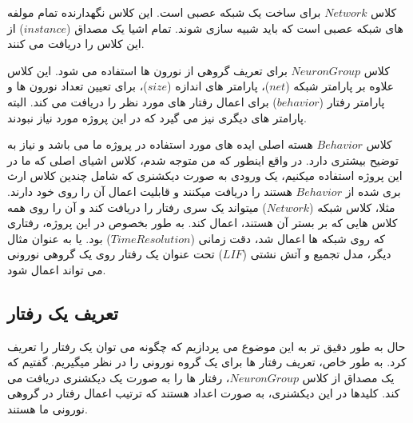 \documentclass{article}
\begin{document}
        کلاس 
        \textbf{$Network$} 
        برای ساخت یک شبکه عصبی است. این کلاس نگهدارنده تمام مولفه های شبکه عصبی است که باید شبیه سازی شوند. تمام اشیا یک مصداق 
        ($instance$) 
        از این کلاس را دریافت می کنند.\cite{PymoNNtorch}

        کلاس 
        \textbf{$NeuronGroup$}
        برای تعریف گروهی از نورون ها استفاده می شود. این کلاس علاوه بر پارامتر شبکه 
        ($net$)،
        پارامتر های اندازه
        ($size$)، 
        برای تعیین تعداد نورون ها و پارامتر رفتار
        ($behavior$) 
        برای اعمال رفتار های مورد نظر را دریافت می کند. البته پارامتر های دیگری نیز می گیرد که در این پروژه مورد نیاز نبودند.

        کلاس 
        \textbf{$Behavior$}
        هسته اصلی ایده های مورد استفاده در پروژه ما می باشد و نیاز به توضیح بیشتری دارد. در واقع اینطور که من متوجه شدم، کلاس اشیای اصلی که ما در این پروژه استفاده میکنیم، یک ورودی به صورت دیکشنری که شامل چندین کلاس ارث بری شده از 
        $Behavior$ 
        هستند را دریافت میکنند و قابلیت اعمال آن را روی خود دارند.
        مثلا، کلاس شبکه
        ($Network$) 
        میتواند یک سری رفتار را دریافت کند و آن را روی همه کلاس هایی که بر بستر آن هستند، اعمال کند. به طور بخصوص در این پروژه، رفتاری که روی شبکه ها اعمال شد، دقت زمانی
        ($TimeResolution$) 
        بود. یا به عنوان مثال دیگر، مدل تجمیع و آتش نشتی
        ($LIF$) 
        تحت عنوان یک رفتار روی یک گروهی نورونی می تواند اعمال شود.

        \subsection{تعریف یک رفتار}
            حال به طور دقیق تر به این موضوع می پردازیم که چگونه می توان یک رفتار را تعریف کرد. به طور خاص، تعریف رفتار ها برای یک گروه نورونی را در نظر میگیریم. گفتیم که یک مصداق از کلاس
            $NeuronGroup$، 
            رفتار ها را به صورت یک دیکشنری دریافت می کند. کلیدها در این دیکشنری، به صورت اعداد هستند که ترتیب اعمال رفتار در گروهی نورونی ما هستند.
            
\end{document}
